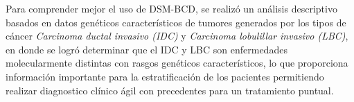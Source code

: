  Para comprender mejor el uso de DSM-BCD, se realizó un análisis descriptivo basados en datos genéticos característicos de tumores generados por los tipos de cáncer \textit{Carcinoma ductal invasivo (IDC)} y \textit{Carcinoma lobulillar invasivo (LBC)}, en donde se logró determinar que el IDC y LBC son enfermedades molecularmente distintas con rasgos genéticos característicos, lo que proporciona información importante para la estratificación de los pacientes permitiendo realizar diagnostico clínico ágil con precedentes para un tratamiento puntual.
 
 
 
 
 
 
 
 
 
 
